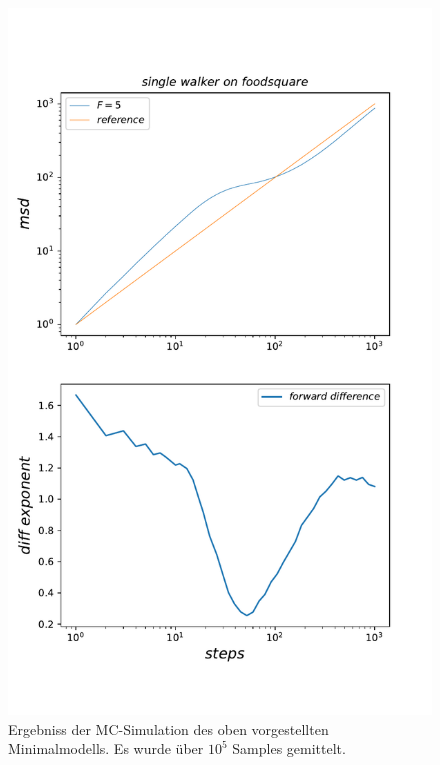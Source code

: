 \documentclass[a4paper, 12pt]{scrartcl}
\begin{document}
\begin{figure}[H]
	\centering
	\includegraphics[scale=0.7]{single_walker_on20x20.pdf}
	\caption{Ergebniss der MC-Simulation des oben vorgestellten Minimalmodells. Es wurde über $10^5$ Samples gemittelt.}
\end{figure}
\end{document}

